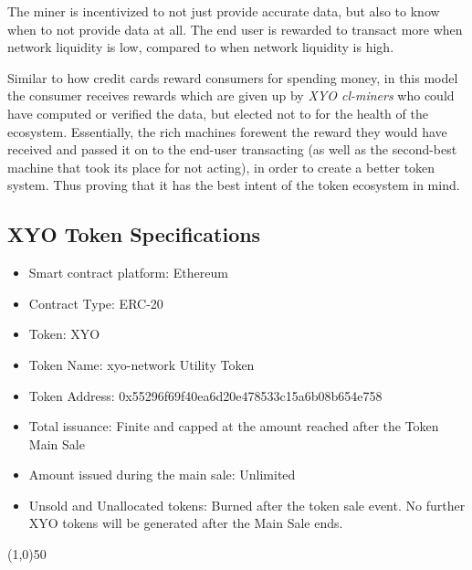 \documentclass{article}
\begin{document}
The miner is incentivized to not just provide accurate data, but also to know when to not provide data at all. The end user is rewarded to transact more when network liquidity is low, compared to when network liquidity is high.

Similar to how credit cards reward consumers for spending money, in this model the consumer receives rewards which are given up by \textit{XYO cl-miners} who could have computed or verified the data, but elected not to for the health of the ecosystem. Essentially, the rich machines forewent the reward they would have received and passed it on to the end-user transacting (as well as the second-best machine that took its place for not acting), in order to create a better token system. Thus proving that it has the best intent of the token ecosystem in mind.

\subsection {XYO Token Specifications}
\begin{itemize}
\item Smart contract platform: Ethereum
\item Contract Type: ERC-20
\item Token: XYO
\item Token Name: \Gls{xyo-network} Utility Token
\item Token Address: 0x55296f69f40ea6d20e478533c15a6b08b654e758
\item Total issuance: Finite and capped at the amount reached after the Token Main Sale
\item Amount issued during the main sale: Unlimited
\item Unsold and Unallocated tokens: Burned after the token sale event. No further XYO tokens will be generated after the Main Sale ends.
\end{itemize}

\begin{center}
\line(1,0){50}
\end{center}

\end{document}

